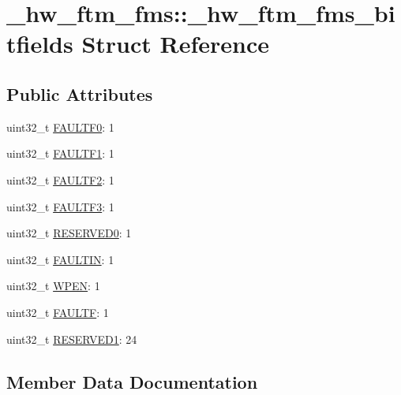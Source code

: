 \hypertarget{struct__hw__ftm__fms_1_1__hw__ftm__fms__bitfields}{}\section{\+\_\+hw\+\_\+ftm\+\_\+fms\+:\+:\+\_\+hw\+\_\+ftm\+\_\+fms\+\_\+bitfields Struct Reference}
\label{struct__hw__ftm__fms_1_1__hw__ftm__fms__bitfields}
\subsection*{Public Attributes}
\begin{DoxyCompactItemize}
\item 
uint32\+\_\+t \hyperlink{struct__hw__ftm__fms_1_1__hw__ftm__fms__bitfields_a011d4bc561a249186156295eab7e5d4d}{F\+A\+U\+L\+T\+F0}\+: 1
\item 
uint32\+\_\+t \hyperlink{struct__hw__ftm__fms_1_1__hw__ftm__fms__bitfields_ab5a169f010133daf2269697cf3dd3ce9}{F\+A\+U\+L\+T\+F1}\+: 1
\item 
uint32\+\_\+t \hyperlink{struct__hw__ftm__fms_1_1__hw__ftm__fms__bitfields_a2aa2bd9d60aa0066d9a1fddc34dca012}{F\+A\+U\+L\+T\+F2}\+: 1
\item 
uint32\+\_\+t \hyperlink{struct__hw__ftm__fms_1_1__hw__ftm__fms__bitfields_aa5c64a41517e801747192a2c0e3b2c79}{F\+A\+U\+L\+T\+F3}\+: 1
\item 
uint32\+\_\+t \hyperlink{struct__hw__ftm__fms_1_1__hw__ftm__fms__bitfields_aa372b0ec84f993176c2125dc3b9b6fd7}{R\+E\+S\+E\+R\+V\+E\+D0}\+: 1
\item 
uint32\+\_\+t \hyperlink{struct__hw__ftm__fms_1_1__hw__ftm__fms__bitfields_a00c5eb753515e7f5a397def1f4346447}{F\+A\+U\+L\+T\+IN}\+: 1
\item 
uint32\+\_\+t \hyperlink{struct__hw__ftm__fms_1_1__hw__ftm__fms__bitfields_a871d175aac339a23b54cdfd6a83b0371}{W\+P\+EN}\+: 1
\item 
uint32\+\_\+t \hyperlink{struct__hw__ftm__fms_1_1__hw__ftm__fms__bitfields_abfccca97fe728508bbe6f8d9f5223345}{F\+A\+U\+L\+TF}\+: 1
\item 
uint32\+\_\+t \hyperlink{struct__hw__ftm__fms_1_1__hw__ftm__fms__bitfields_a8b47302b8db7f8f5424c4d94580dcaf2}{R\+E\+S\+E\+R\+V\+E\+D1}\+: 24
\end{DoxyCompactItemize}


\subsection{Member Data Documentation}
